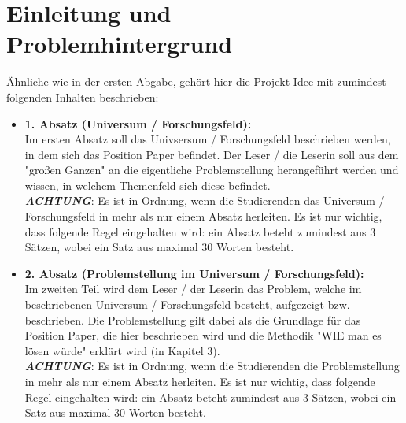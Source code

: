 
\section{Einleitung und Problemhintergrund}


Ähnliche wie in der ersten Abgabe, gehört hier die Projekt-Idee mit zumindest folgenden Inhalten beschrieben:
\begin{itemize}
	\item\textbf{1. Absatz (Universum / Forschungsfeld): } \\
	Im ersten Absatz soll das Univsersum / Forschungsfeld beschrieben werden, in dem sich das Position Paper befindet. Der Leser / die Leserin soll aus dem "großen Ganzen" an die eigentliche Problemstellung herangeführt werden und wissen, in welchem Themenfeld sich diese befindet. \\
	
	\textbf{\textit{ACHTUNG}}: Es ist in Ordnung, wenn die Studierenden das Universum / Forschungsfeld in mehr als nur einem Absatz herleiten. Es ist nur wichtig, dass folgende Regel eingehalten wird: ein Absatz beteht zumindest aus 3 Sätzen, wobei ein Satz aus maximal 30 Worten besteht.\\
	
	\item\textbf{2. Absatz (Problemstellung im Universum / Forschungsfeld): } \\
	Im zweiten Teil wird dem Leser / der Leserin das Problem, welche im beschriebenen Universum / Forschungsfeld besteht, aufgezeigt bzw. beschrieben. Die Problemstellung gilt dabei als die Grundlage für das Position Paper, die hier beschrieben wird und die Methodik "WIE man es lösen würde" erklärt wird (in Kapitel 3). \\
	
	\textbf{\textit{ACHTUNG}}: Es ist in Ordnung, wenn die Studierenden die Problemstellung in mehr als nur einem Absatz herleiten. Es ist nur wichtig, dass folgende Regel eingehalten wird: ein Absatz beteht zumindest aus 3 Sätzen, wobei ein Satz aus maximal 30 Worten besteht.\\
	

\end{itemize}
